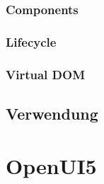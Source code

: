 \subsubsection{Components}



\subsubsection{Lifecycle}

\subsubsection{Virtual DOM}

\subsection{Verwendung}




\section{OpenUI5}